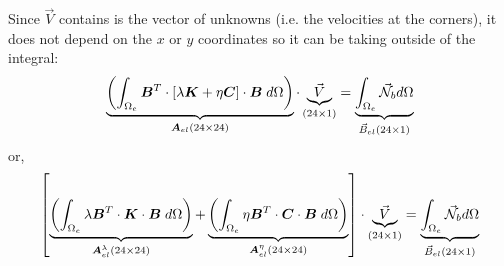 Since $\vec V$ contains is the vector of unknowns (i.e. the velocities at the corners), 
it does not depend on the $x$ or $y$ coordinates
so it can be taking outside of the integral:
\[
\underbrace{
\left(\int_{\Omega_e} {\bm B}^T \cdot [ \lambda {\bm K} + \eta {\bm C} ] \cdot {\bm B} \;  d\Omega \right) 
}_{\bm A_{el}(24 \times 24)}
\cdot 
\underbrace{
{\vec V}
}_{(24\times 1)}
=
\underbrace{
\int_{\Omega_e} {\vec {{\mathcal{N}}}}_b d\Omega 
}_{\vec B_{el} (24\times 1)}
\]
or, 
\[
\left[
\underbrace{
\left(\int_{\Omega_e} \lambda {\bm B}^T \cdot {\bm K} \cdot {\bm B} \; d\Omega \right) 
}_{\bm A_{el}^\lambda(24 \times 24)}
+
\underbrace{
\left(\int_{\Omega_e}  \eta {\bm B}^T \cdot {\bm C}  \cdot {\bm B} \;  d\Omega \right) 
}_{\bm A_{el}^\eta(24 \times 24)}
\right]
\cdot 
\underbrace{
{\vec V}
}_{(24\times 1)}
=
\underbrace{
\int_{\Omega_e} {\vec {{\mathcal{N}}}}_b d\Omega 
}_{\vec B_{el} (24\times 1)}
\]

\Literature \cite{odks82,dhhu86}


